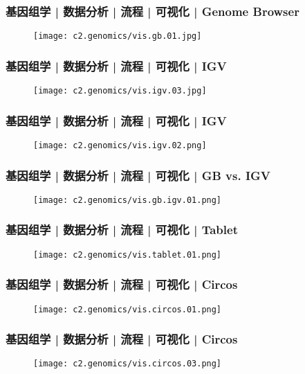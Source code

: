 \begin{frame}
  \frametitle{基因组学 | 数据分析 | 流程 | 可视化 | Genome Browser}
  \begin{figure}
    \centering
    \texttt{[image: c2.genomics/vis.gb.01.jpg]}
  \end{figure}
\end{frame}

\begin{frame}
  \frametitle{基因组学 | 数据分析 | 流程 | 可视化 | IGV}
  \begin{figure}
    \centering
    \texttt{[image: c2.genomics/vis.igv.03.jpg]}
  \end{figure}
\end{frame}

\begin{frame}
  \frametitle{基因组学 | 数据分析 | 流程 | 可视化 | IGV}
  \begin{figure}
    \centering
    \texttt{[image: c2.genomics/vis.igv.02.png]}
  \end{figure}
\end{frame}

\begin{frame}
  \frametitle{基因组学 | 数据分析 | 流程 | 可视化 | GB vs. IGV}
  \begin{figure}
    \centering
    \texttt{[image: c2.genomics/vis.gb.igv.01.png]}
  \end{figure}
\end{frame}

\begin{frame}
  \frametitle{基因组学 | 数据分析 | 流程 | 可视化 | Tablet}
  \begin{figure}
    \centering
    \texttt{[image: c2.genomics/vis.tablet.01.png]}
  \end{figure}
\end{frame}

\begin{frame}
  \frametitle{基因组学 | 数据分析 | 流程 | 可视化 | Circos}
  \begin{figure}
    \centering
    \texttt{[image: c2.genomics/vis.circos.01.png]}
  \end{figure}
\end{frame}

\begin{frame}
  \frametitle{基因组学 | 数据分析 | 流程 | 可视化 | Circos}
  \begin{figure}
    \centering
    \texttt{[image: c2.genomics/vis.circos.03.png]}
  \end{figure}
\end{frame}

